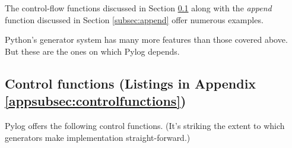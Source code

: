 
The control-flow functions discussed in Section \ref{subsec:controlfunctions} along with the \textit{append} function discussed in Section \ref{subsec:append} offer numerous examples.

\largev
Python's generator system has many more features than those covered above. But these are the ones on which Pylog depends. 

\subsection{Control functions (Listings in Appendix \ref{appsubsec:controlfunctions})} \label{subsec:controlfunctions}

Pylog offers the following control functions. (It's striking the extent to which generators make implementation straight-forward.)

